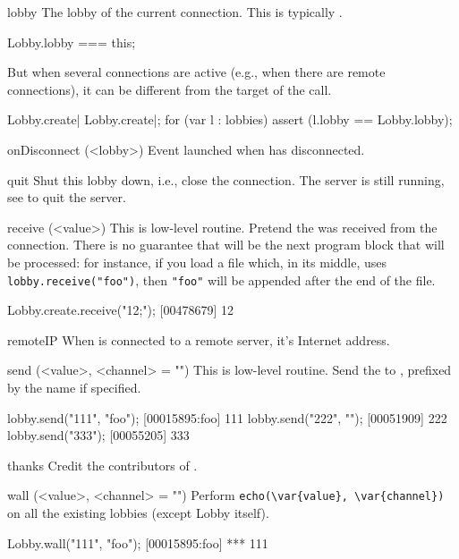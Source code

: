 \begin{urbiscriptapi}
\item[lobby]
  The lobby of the current connection.  This is typically \this.
\begin{urbiassert}
Lobby.lobby === this;
\end{urbiassert}

  But when several connections are active (e.g., when there are remote
  connections), it can be different from the target of the call.

\begin{urbiscript}
Lobby.create| Lobby.create|;
for (var l : lobbies)
  assert (l.lobby == Lobby.lobby);
\end{urbiscript}

\item[onDisconnect](<lobby>)%
  Event launched when \this has disconnected.

\item[quit] Shut this lobby down, i.e., close the connection.  The
  server is still running, see  to quit the
  server.

\item[receive](<value>)%
  This is low-level routine.  Pretend the 
   was received from the connection.  There is no guarantee
  that  will be the next program block that will be
  processed: for instance, if you load a file which, in its middle,
  uses \lstinline|lobby.receive("foo")|, then \lstinline|"foo"| will
  be appended after the end of the file.
\begin{urbiscript}
Lobby.create.receive("12;");
[00478679] 12
\end{urbiscript}

\item[remoteIP]
  When \this is connected to a remote server, it's Internet address.

\item[send](<value>, <channel> = "")%
  This is low-level routine.  Send the  
  to \this, prefixed by the 
   name if specified.
\begin{urbiscript}
lobby.send("111", "foo");
[00015895:foo] 111
lobby.send("222", "");
[00051909] 222
lobby.send("333");
[00055205] 333
\end{urbiscript}

\item[thanks] Credit the contributors of \usdk.

\item[wall](<value>, <channel> = "")%
  Perform \lstinline|echo(\var{value}, \var{channel})| on all the
  existing lobbies (except Lobby itself).
\begin{urbiscript}[firstnumber=1]
Lobby.wall("111", "foo");
[00015895:foo] *** 111
\end{urbiscript}


\end{urbiscriptapi}
